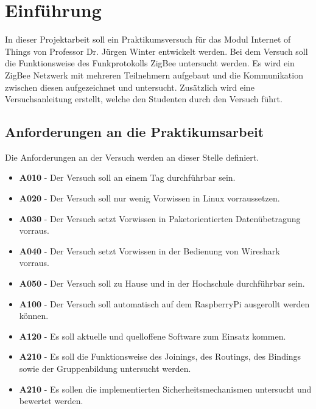 \chapter{Einführung}

In dieser Projektarbeit soll ein Praktikumsversuch für das Modul \grqq Internet of Things\grqq{} von Professor Dr. Jürgen Winter 
entwickelt werden. Bei dem Versuch soll die Funktionsweise des Funkprotokolls ZigBee untersucht werden. Es wird ein 
ZigBee Netzwerk mit mehreren Teilnehmern aufgebaut und die Kommunikation zwischen diesen aufgezeichnet und untersucht. 
Zusätzlich wird eine Versuchsanleitung erstellt, welche den Studenten durch den Versuch führt.

\section{Anforderungen an die Praktikumsarbeit}

Die Anforderungen an der Versuch werden an dieser Stelle definiert.
\begin{itemize}
    \item \textbf{A010} - Der Versuch soll an einem Tag durchführbar sein.
    \item \textbf{A020} - Der Versuch soll nur wenig Vorwissen in Linux vorraussetzen.
    \item \textbf{A030} - Der Versuch setzt Vorwissen in Paketorientierten Datenübetragung vorraus.
    \item \textbf{A040} - Der Versuch setzt Vorwissen in der Bedienung von Wireshark vorraus.
    \item \textbf{A050} - Der Versuch soll zu Hause und in der Hochschule durchführbar sein.
    \item \textbf{A100} - Der Versuch soll automatisch auf dem RaspberryPi ausgerollt werden können.
    \item \textbf{A120} - Es soll aktuelle und quelloffene Software zum Einsatz kommen.
    \item \textbf{A210} - Es soll die Funktionsweise des Joinings, des Routings, des Bindings sowie der Gruppenbildung untersucht werden.
    \item \textbf{A210} - Es sollen die implementierten Sicherheitsmechanismen untersucht und bewertet werden.
\end{itemize}

